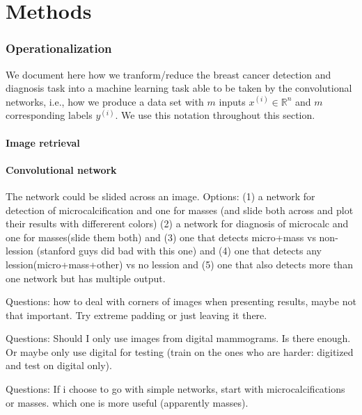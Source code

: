 \documentclass[11pt]{article}
\begin{document}
	\part{Methods}
	\section{Operationalization}
	We document here how we tranform/reduce the breast cancer detection and diagnosis task into a machine learning task able to be taken by the convolutional networks, i.e., how we produce a data set with $m$ inputs $x^{(i)} \in \mathbb{R}^n$ and $m$ corresponding labels $y^{(i)}$. We use this notation throughout this section. 
	\subsection{Image retrieval}
	

	\subsection{Convolutional network}
	The network could be slided across an image. Options: (1) a network for detection of microcalcification and one for masses (and slide both across and plot their results with differerent colors) (2) a network for diagnosis of microcalc and one for masses(slide them both) and (3) one that detects micro+mass vs non-lession (stanford guys did bad with this one) and (4) one that detects any lession(micro+mass+other) vs no lession and (5) one that also detects more than one network but has multiple output.
	
	Questions: how to deal with corners of images when presenting results, maybe not that important. Try extreme padding or just leaving it there.

	Questions: Should I only use images from digital mammograms. Is there enough. Or maybe only use digital for testing (train on the ones who are harder: digitized and test on digital only).

	Questions: If i choose to go with simple networks, start with microcalcifications or masses. which one is more useful (apparently masses).
\end{document}
